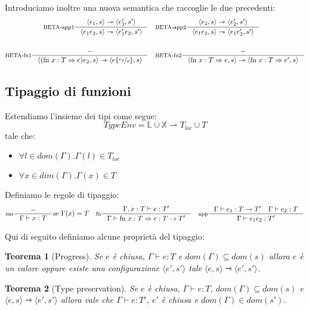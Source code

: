 \documentclass[a4paper, 11pt]{article}
\newtheorem{thm}{Teorema}[section]
\newcommand{\type}{\Gamma \vdash}
\newcommand{\subs}[3]{#1 \lbrace \sfrac{#2}{#3} \rbrace}
\begin{document}
Introduciamo inoltre una nuova semantica che raccoglie le due precedenti: 
\begin{align*}
	\inference[BETA-app1]{\langle e_1, s \rangle \rightarrowtriangle \langle e_1', s' \rangle}{\langle e_1e_2,s \rangle \rightarrowtriangle \langle e_1'e_2, s' \rangle} \quad &\inference[BETA-app2]{\langle e_2,s \rangle \rightarrowtriangle \langle e_2',s' \rangle}{\langle e_1e_2,s \rangle \rightarrowtriangle \langle e_1e_2',s' \rangle} \\ \\
	\inference[BETA-fn1]{-}{\langle (\text{fn }x:T \Rightarrow e)e_2, s \rangle \rightarrowtriangle \langle \subs{e}{e_2}{x},s \rangle} \quad &\inference[BETA-fn2]{-}{\langle \text{fn }x:T \Rightarrow e, s \rangle \rightarrowtriangle \langle \text{fn }x:T \Rightarrow e', s \rangle}
\end{align*}

\subsection{Tipaggio di funzioni}
Estendiamo l'insieme dei tipi come segue: 
\[ 
	TypeEnv = \mathbb{L} \cup \mathbb{X} \rightharpoonup T_{loc} \cup T 
\] 
tale che: 
\begin{itemize}
	\item $\forall l \in dom(\Gamma). \Gamma(l) \in T_{loc}$
	\item $\forall x \in dim(\Gamma). \Gamma(x) \in T$
\end{itemize}

Definiamo le regole di tipaggio: 
\begin{align*}
	\inference[var]{-}{\type x:T} \text{se } \Gamma(x) = T \quad 
	\inference[fn]{\Gamma, x :T \vdash e:T'}{\type \text{fn } x :T \Rightarrow e:T \to T'} \quad
	\inference[app]{\type e_1:T \to T' \quad \type e_2:T}{\type e_1e_2:T'}
\end{align*}

Qui di seguito definiamo alcune proprietà del tipaggio:
\begin{thm}[Progress]
	Se $e$ è chiusa, $\type e:T$ e $dom(\Gamma) \subseteq dom(s)$ allora $e$ è un valore oppure esiste una configurazione $\langle e',s' \rangle$ tale $\langle e,s \rangle \rightarrowtriangle \langle e',s' \rangle$.
\end{thm}

\begin{thm}[Type preservation]
	Se $e$ è chiusa, $\type e:T$, $dom(\Gamma) \subseteq dom(s)$ e $\langle e,s \rangle \rightarrowtriangle \langle e',s' \rangle$ allora vale che $\type e:T'$, $e'$ è chiusa e $dom(\Gamma) \in dom(s')$.
\end{thm}
\end{document}
